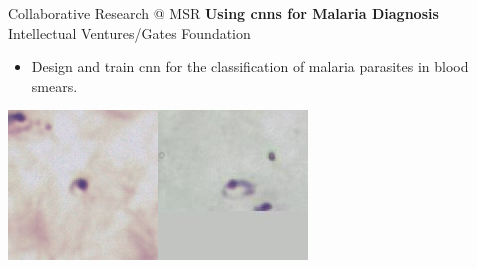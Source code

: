 \documentclass[t,xcolor=dvipsnames]{beamer}
\begin{document}
\usebackgroundtemplate{}

\begin{frame}{Collaborative Research @ MSR}
\textbf{Using \glspl{cnn} for Malaria Diagnosis}\\{\footnotesize Intellectual Ventures/Gates Foundation}
\begin{itemize}
    \item Design and train \gls{cnn} for the classification of malaria parasites in blood smears.
\end{itemize}
\vfill
\includegraphics[width=0.45\linewidth]{malarianegative}\hfill\includegraphics[width=0.45\linewidth]{malariapositive}
\end{frame}
\end{document}
